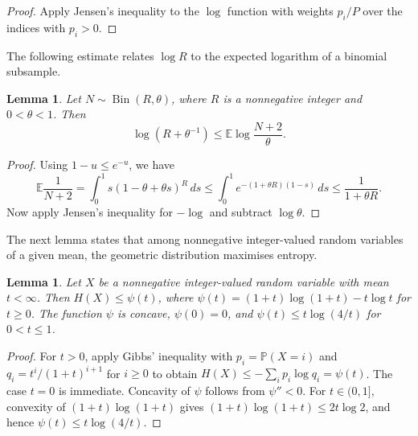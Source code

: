 \documentclass[reqno,final,a4paper]{amsart}
\numberwithin{equation}{section}
\newtheorem{lemma}[theorem]{Lemma}
\theoremstyle{definition}
\theoremstyle{remark}
\DeclareMathOperator{\Bin}{Bin}
\renewcommand{\Pr}{\mathbb P}
\begin{document}
\begin{proof}
Apply Jensen's inequality to the $\log$ function with weights $p_i/P$
over the indices with $p_i>0$.
\end{proof}

The following estimate relates $\log R$ to the expected logarithm of a binomial subsample.
\begin{lemma}\label{cla:binomial}
Let $N\sim\Bin(R,\theta)$, where $R$ is a nonnegative integer
and $0<\theta<1$. Then
\[
    \log\left(R+\theta^{-1}\right)
    \le\mathbb E\log\frac{N+2}{\theta}.
\]
\end{lemma}

\begin{proof}
Using $1-u\le e^{-u}$, we have
\[
    \mathbb E\frac1{N+2}
    =\int_0^1 s(1-\theta+\theta s)^R\,ds
    \le\int_0^1 e^{-(1+\theta R)(1-s)}\,ds
    \le\frac1{1+\theta R}.
\]
Now apply Jensen's inequality for $-\log$
and subtract $\log\theta$.
\end{proof}

The next lemma states that among nonnegative integer-valued random variables of a given mean, the geometric distribution maximises entropy.

\begin{lemma}\label{lem:maxentropy}
Let $X$ be a nonnegative integer-valued random variable
with mean $t<\infty$.
Then $H(X)\le\psi(t)$, where
$\psi(t)=(1+t)\log(1+t)-t\log t$ for $t\ge0$.
The function $\psi$ is concave, $\psi(0)=0$, and
$\psi(t)\le t\log(4/t)$ for $0<t\le1$.
\end{lemma}

\begin{proof}
For $t>0$, apply Gibbs' inequality with $p_i=\Pr(X=i)$
and $q_i=t^i/(1+t)^{i+1}$ for $i\ge0$ to obtain
$H(X)\le-\sum_i p_i\log q_i=\psi(t)$.
The case $t=0$ is immediate.
Concavity of $\psi$ follows from $\psi''<0$.
For $t \in (0,1]$, convexity of $(1+t)\log (1+t)$ gives
$(1+t)\log(1+t)\le2t\log2$, and hence
$\psi(t)\le t\log(4/t)$.
\end{proof}
\end{document}
